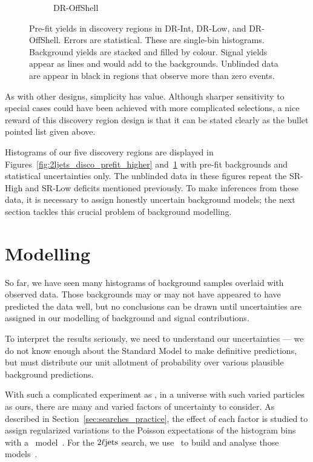 \begin{figure}[tp]
\begin{subfigure}{0.495\textwidth}
\caption{DR-OffShell}
\end{subfigure}
\caption[
Pre-fit yields in discovery regions in DR-Int, DR-Low, and DR-OffShell
]{%
Pre-fit yields in discovery regions in DR-Int, DR-Low, and DR-OffShell.
Errors are statistical.
These are single-bin histograms.
Background yields are stacked and filled by colour.
Signal yields appear as lines and would add to the backgrounds.
Unblinded data are appear in black in regions that observe more than zero
events.%
}
\label{fig:2ljets_disco_prefit_lower}
\end{figure}

As with other designs, simplicity has value.
Although sharper sensitivity to special cases could have been achieved
with more complicated selections, a nice reward of this discovery region design
is that it can be stated clearly as the bullet pointed list given above.

Histograms of our five discovery regions are displayed in
Figures~\ref{fig:2ljets_disco_prefit_higher}
and~\ref{fig:2ljets_disco_prefit_lower}
with pre-fit backgrounds and statistical uncertainties only.
The unblinded data in these figures repeat the SR-High and SR-Low deficits
mentioned previously.
To make inferences from these data, it is necessary to assign honestly
uncertain background models; the next section tackles this crucial problem of
background modelling.

\section{Modelling}
\label{sec:2ljets_modelling}
So far, we have seen many histograms of background samples overlaid with
observed data.
Those backgrounds may or may not have appeared to have predicted the data well,
but no conclusions can be drawn until uncertainties are assigned in our
modelling of background and signal contributions.

To interpret the results seriously, we need to understand our uncertainties ---
we do not know enough about the Standard Model to make definitive predictions,
but must distribute our unit allotment of probability over various plausible
background predictions.

With such a complicated experiment as \atlas, in a universe with such varied
particles as ours, there are many and varied factors of uncertainty to consider.
As described in Section~\ref{sec:searches_practice}, the effect of each
factor is studied to assign regularized variations to the Poisson expectations
of the histogram bins with a \histfactory\ model~\cite{cranmer2012histfactory}.
For the $2\ell\mathrm{jets}$ search, we use \histfitter\ to build and analyse those
models~\cite{Besjes_2015,baak2015histfitter}.

